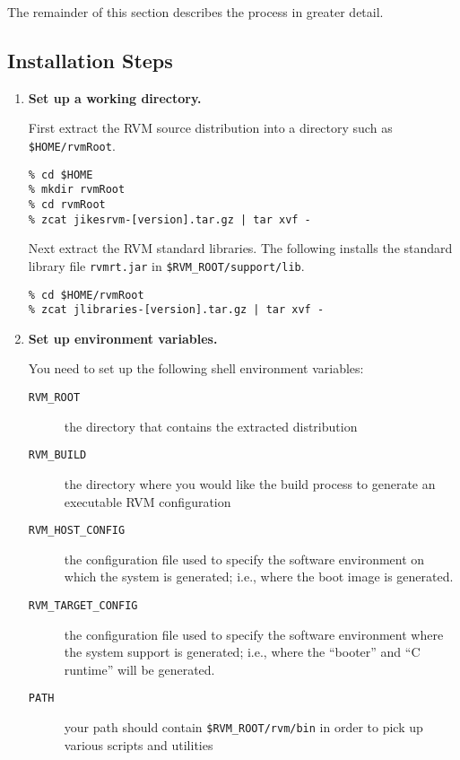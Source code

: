 The remainder of this section describes the process in greater detail.

\subsection{Installation Steps}

\begin{enumerate}
\item {\bf Set up a working directory.}

First extract the RVM source distribution into a directory such as 
{\tt \$HOME/rvmRoot}.
\begin{verbatim}
% cd $HOME
% mkdir rvmRoot
% cd rvmRoot
% zcat jikesrvm-[version].tar.gz | tar xvf - 
\end{verbatim}

Next extract the RVM standard libraries.  The following installs the
standard library file {\tt rvmrt.jar} in {\tt \$RVM\_ROOT/support/lib}.
\begin{verbatim}
% cd $HOME/rvmRoot
% zcat jlibraries-[version].tar.gz | tar xvf - 
\end{verbatim}

\item {\bf Set up environment variables.}

You need to set up the following shell environment variables:

\begin{description}
\item [{\tt RVM\_ROOT}] the directory that contains the extracted
distribution 
\item [{\tt RVM\_BUILD}] the directory where you would like the build
process to generate an executable RVM configuration

\item [{\tt RVM\_HOST\_CONFIG}] the configuration file used to specify
the software environment on which the system is generated; i.e., where the
boot image is generated.

\item [{\tt RVM\_TARGET\_CONFIG}] the configuration file used to specify
the software environment where the system support is generated; i.e., where
the ``booter'' and ``C runtime'' will be generated.

\item[{\tt PATH}] your path should contain {\tt \$RVM\_ROOT/rvm/bin} in
order to pick up various scripts and utilities
\end{description}


\end{enumerate}
